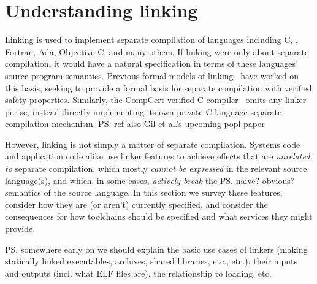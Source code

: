 \section{Understanding linking}

Linking is used to implement separate compilation 
of languages including C, \Cplusplus{}, Fortran, Ada, Objective-C, and
many others.
If linking were only about separate compilation, it would have a natural specification
in terms of these languages' source program semantics.
Previous formal models of linking~\cite{cardelli-program-1997, glew-type-safe-1999}
have worked on this basis, 
seeking to provide a formal basis for separate compilation with verified safety properties.
Similarly, the CompCert verified C compiler~\cite{leroy-formal-2009} 
omits any linker per se, instead 
directly implementing its own private C-language separate compilation mechanism.
\ps{ref also Gil et al.'s upcoming popl paper}

However, linking is not simply a matter of separate compilation.
Systems code and application code alike 
use linker features to achieve effects that are \emph{unrelated to} separate compilation,
which mostly \emph{cannot be expressed} in the relevant source language(s), 
and which, in some cases, \emph{actively break} the \ps{naive?
  obvious?} semantics of the source language.
In this section we survey these features,
consider how they are (or aren't) currently specified, 
and consider the consequences for 
how toolchains should be specified and what services they might provide.

% 
% 
% 


\ps{somewhere early on we should explain the basic use cases of
  linkers (making statically linked executables, archives, shared
  libraries, etc., etc.), their inputs and outputs (incl. what ELF
  files are), the relationship
  to loading, etc.}

